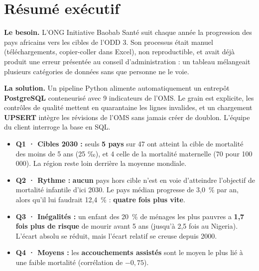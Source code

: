 \documentclass[11pt, a4paper, oneside, headings=normal, numbers=noenddot, DIV=12]{scrartcl}
\begin{document}
\begingroup
{}
\setcounter{tocdepth}{2}
\tableofcontents
\endgroup
\clearpage

\section{Résumé exécutif}\label{sec:resume}

\textbf{Le besoin.} L'ONG Initiative Baobab Santé suit chaque année la progression des pays africains vers les cibles de l'ODD 3.
Son processus était manuel (téléchargements, copier-coller dans Excel), non reproductible, et avait déjà produit une erreur présentée
au conseil d'administration : un tableau mélangeait plusieurs catégories de données sans que personne ne le voie.

\textbf{La solution.} Un pipeline Python alimente automatiquement un entrepôt \textbf{PostgreSQL} conteneurisé avec 9 indicateurs
de l'OMS. Le grain est explicite, les contrôles de qualité mettent en quarantaine les lignes invalides, et un chargement
\textbf{UPSERT} intègre les révisions de l'OMS sans jamais créer de doublon. L'équipe du client interroge la base en SQL.


\begin{keybox}
\begin{itemize}[leftmargin=1.2em]
  \item \textbf{Q1 · Cibles 2030 :} seuls \textbf{5 pays} sur 47 ont atteint la cible de mortalité des moins de 5 ans (25 ‰),
        et 4 celle de la mortalité maternelle (70 pour 100\,000). La région reste loin derrière la moyenne mondiale.
  \item \textbf{Q2 · Rythme :} \textbf{aucun} pays hors cible n'est en voie d'atteindre l'objectif de mortalité infantile d'ici 2030.
        Le pays médian progresse de 3,0~\% par an, alors qu'il lui faudrait 12,4~\% : \textbf{quatre fois plus vite}.
  \item \textbf{Q3 · Inégalités :} un enfant des 20~\% de ménages les plus pauvres a \textbf{1,7 fois plus de risque} de mourir
        avant 5 ans (jusqu'à 2,5 fois au Nigeria). L'écart absolu se réduit, mais l'écart relatif se creuse depuis 2000.
  \item \textbf{Q4 · Moyens :} les \textbf{accouchements assistés} sont le moyen le plus lié à une faible mortalité (corrélation de $-0{,}75$).
\end{itemize}
\end{keybox}
\end{document}
